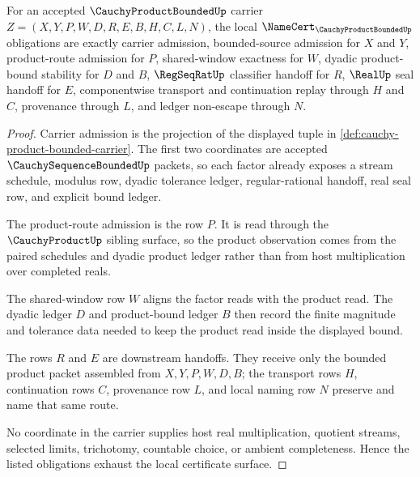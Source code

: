 \begin{theorem}
\label{thm:cauchy-product-bounded-namecert-obligations}
For an accepted $\CauchyProductBoundedUp$ carrier $Z=(X,Y,P,W,D,R,E,B,H,C,L,N)$, the local $\NameCert_{\CauchyProductBoundedUp}$ obligations are exactly carrier admission, bounded-source admission for $X$ and $Y$, product-route admission for $P$, shared-window exactness for $W$, dyadic product-bound stability for $D$ and $B$, $\RegSeqRatUp$ classifier handoff for $R$, $\RealUp$ seal handoff for $E$, componentwise transport and continuation replay through $H$ and $C$, provenance through $L$, and ledger non-escape through $N$.
\end{theorem}
\begin{proof}
Carrier admission is the projection of the displayed tuple in \autoref{def:cauchy-product-bounded-carrier}. The first two coordinates are accepted $\CauchySequenceBoundedUp$ packets, so each factor already exposes a stream schedule, modulus row, dyadic tolerance ledger, regular-rational handoff, real seal row, and explicit bound ledger.

The product-route admission is the row $P$. It is read through the $\CauchyProductUp$ sibling surface, so the product observation comes from the paired schedules and dyadic product ledger rather than from host multiplication over completed reals.

The shared-window row $W$ aligns the factor reads with the product read. The dyadic ledger $D$ and product-bound ledger $B$ then record the finite magnitude and tolerance data needed to keep the product read inside the displayed bound.

The rows $R$ and $E$ are downstream handoffs. They receive only the bounded product packet assembled from $X,Y,P,W,D,B$; the transport rows $H$, continuation rows $C$, provenance row $L$, and local naming row $N$ preserve and name that same route.

No coordinate in the carrier supplies host real multiplication, quotient streams, selected limits, trichotomy, countable choice, or ambient completeness. Hence the listed obligations exhaust the local certificate surface.
\end{proof}

